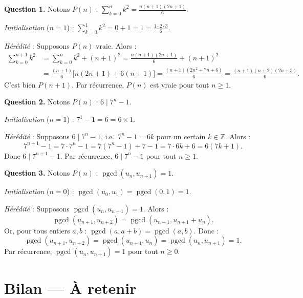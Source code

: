 \documentclass[11pt,a4paper,twoside]{book}
\newcommand{\Z}{\mathbb{Z}}
\newcommand{\ds}{\displaystyle}
\DeclareMathOperator{\pgcd}{pgcd}
\begin{document}
\begin{correctionbox}
\textbf{Question 1.} Notons $P(n)$ : $\ds\sum_{k=0}^{n} k^2 = \frac{n(n+1)(2n+1)}{6}$.

\textit{Initialisation} ($n=1$) : $\sum_{k=0}^{1} k^2 = 0 + 1 = 1 = \frac{1 \cdot 2 \cdot 3}{6}$. \checkmark

\textit{Hérédité} : Supposons $P(n)$ vraie. Alors :
\begin{align*}
  \sum_{k=0}^{n+1} k^2
  &= \sum_{k=0}^{n} k^2 + (n+1)^2
  = \frac{n(n+1)(2n+1)}{6} + (n+1)^2 \\
  &= \frac{(n+1)}{6}\bigl[n(2n+1) + 6(n+1)\bigr]
  = \frac{(n+1)(2n^2+7n+6)}{6}
  = \frac{(n+1)(n+2)(2n+3)}{6}.
\end{align*}
C'est bien $P(n+1)$. Par récurrence, $P(n)$ est vraie pour tout $n \geq 1$.

\medskip
\textbf{Question 2.} Notons $P(n)$ : $6 \mid 7^n - 1$.

\textit{Initialisation} ($n=1$) : $7^1 - 1 = 6 = 6 \times 1$. \checkmark

\textit{Hérédité} : Supposons $6 \mid 7^n - 1$, i.e.\ $7^n - 1 = 6k$ pour un certain
$k \in \Z$. Alors :
\[
  7^{n+1} - 1 = 7 \cdot 7^n - 1 = 7(7^n - 1) + 7 - 1 = 7 \cdot 6k + 6 = 6(7k + 1).
\]
Donc $6 \mid 7^{n+1} - 1$. Par récurrence, $6 \mid 7^n - 1$ pour tout $n \geq 1$.

\medskip
\textbf{Question 3.} Notons $P(n)$ : $\pgcd(u_n, u_{n+1}) = 1$.

\textit{Initialisation} ($n=0$) : $\pgcd(u_0, u_1) = \pgcd(0,1) = 1$. \checkmark

\textit{Hérédité} : Supposons $\pgcd(u_n, u_{n+1}) = 1$. Alors :
\[
  \pgcd(u_{n+1}, u_{n+2}) = \pgcd(u_{n+1}, u_{n+1} + u_n).
\]
Or, pour tous entiers $a, b$ : $\pgcd(a, a+b) = \pgcd(a, b)$. Donc :
\[
  \pgcd(u_{n+1}, u_{n+2}) = \pgcd(u_{n+1}, u_n) = \pgcd(u_n, u_{n+1}) = 1.
\]
Par récurrence, $\pgcd(u_n, u_{n+1}) = 1$ pour tout $n \geq 0$.
\end{correctionbox}

\section{Bilan — À retenir}
\end{document}
